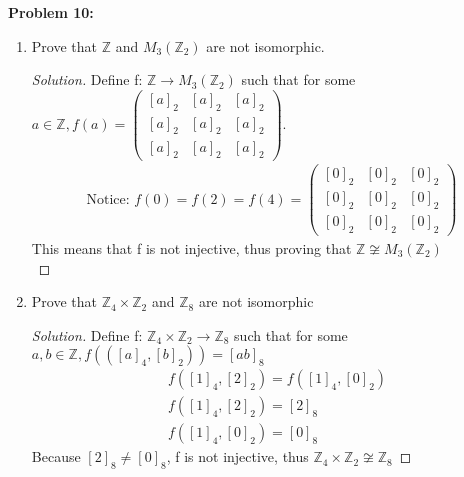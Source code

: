 \documentclass[12pt]{article}
\begin{document}
\newpage
\noindent \textbf{Problem 10: }
	\begin{enumerate}[label = (\alph*)]
		\item Prove that $\mathbb{Z}$ and $M_3(\mathbb{Z}_2)$ are not isomorphic.
		\begin{proof}[Solution]
			Define f: $\mathbb{Z} \rightarrow M_3(\mathbb{Z}_2)$ such that for some $a \in \mathbb{Z}, f(a) = 
			\begin{pmatrix}
				[a]_2 & [a]_2 & [a]_2 \\
				[a]_2 & [a]_2 & [a]_2 \\
				[a]_2 & [a]_2 & [a]_2 
			\end{pmatrix}$.
			\begin{align*}
				\text{Notice: } f(0) = f(2) = f(4) = 
				\begin{pmatrix}
					[0]_2 & [0]_2 & [0]_2 \\
					[0]_2 & [0]_2 & [0]_2 \\
					[0]_2 & [0]_2 & [0]_2 
				\end{pmatrix}
			\end{align*}
			This means that f is not injective, thus proving that $\mathbb{Z} \not \cong M_3(\mathbb{Z}_2)$ \\
		\end{proof}
		\item Prove that $\mathbb{Z}_4 \times \mathbb{Z}_2$ and $\mathbb{Z}_8$ are not isomorphic
		\begin{proof}[Solution]
			Define f: $\mathbb{Z}_4 \times \mathbb{Z}_2 \rightarrow \mathbb{Z}_8$ such that for some $a,b \in \mathbb{Z}, f(([a]_4,[b]_2)) = [ab]_8$ 
			\begin{align*}
				&f([1]_4,[2]_2) = f([1]_4,[0]_2) \\ 
				&f([1]_4,[2]_2) = [2]_8 \\
				&f([1]_4,[0]_2) = [0]_8 
			\end{align*}
			Because $[2]_8 \not = [0]_8$, f is not injective, thus $\mathbb{Z}_4 \times \mathbb{Z}_2 \not \cong \mathbb{Z}_8$
		\end{proof}
	\end{enumerate}
\end{document}
